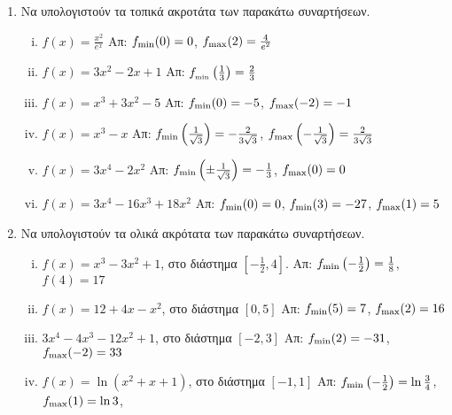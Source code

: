 


\everymath{\displaystyle}



\begin{center}
\end{center}


\vspace{\baselineskip}

\begin{enumerate}
    \item Να υπολογιστούν τα τοπικά ακροτάτα των παρακάτω συναρτήσεων.

        \begin{enumerate}[i)]
            \item $ f(x) = \frac{x^{2}}{e^{x}}  $ \hfill Απ: $ f_{\rm min}(0) = 0 $, $ f_{\rm max}(2) = \frac{4}{e^{2}} $ 

        \item $ f(x) = 3x^{2}-2x+1 $ \hfill Απ: $ f_{\rm_{min}}\left(\frac{1}{3}\right) = \frac{2}{3} $ 
        \item $ f(x) = x^{3}+3x^{2}-5 $ \hfill Απ: $ f_{\rm min}(0) = -5 $, $ f_{\rm max}(-2) = -1 $ 
        \item $ f(x) = x^{3} - x $ \hfill Απ: $ f_{\rm min}\left(\frac{1}{\sqrt{3}}\right) = -
            \frac{2}{3 \sqrt{3}} $, $ f_{\rm max}\left(-\frac{1}{\sqrt{3}}\right) = \frac{2}{3 \sqrt{3}} $

        \item $ f(x) = 3x^{4} - 2x^{2} $ \hfill Απ: $ f_{\rm min}\left(\pm \frac{1}{\sqrt{3}}\right) = - \frac{1}{3} $, $ f_{\rm max}(0) = 0 $

        \item $ f(x) = 3x^{4} -16x^{3}+18x^{2} $ \hfill Απ: $ f_{\rm min}(0)=0 $, $ f_{\rm
            min}(3)=-27 $, $ f_{\rm max}(1) = 5 $ 

        \end{enumerate}

    \item Να υπολογιστούν τα ολικά ακρότατα των παρακάτω συναρτήσεων.
        \begin{enumerate}[i)]
            \item $ f(x) = x^{3} - 3x^{2} + 1 $, στο διάστημα $ \left[- \frac{1}{2}, 4\right] $. \hfill Απ: $ f_{\rm min}\left(- \frac{1}{2}\right) = \frac{1}{8} $, $ f(4) = 17 $
            \item $ f(x) = 12 + 4x - x^{2} $, στο διάστημα $ [0,5] $ \hfill Απ: $ f_{\rm min}(5)=7
                $, $ f_{\rm max}(2)=16 $ 
            \item $ 3x^{4}-4x^{3}-12x^{2} + 1 $, στο διάστημα $ [-2,3] $ \hfill Απ: $ f_{\rm
                min}(2)=-31 $, $ f_{\rm max}(-2)=33 $
            \item $ f(x)= \ln{(x^{2}+x+1)} $, στο διάστημα $ [-1,1] $ \hfill Απ: $ f_{\rm
                min}\left(-\frac{1}{2}\right)= \ln{ \frac{3}{4} }$, $ f_{\rm max}(1)=
                \ln{3} $,  

        \end{enumerate}
\end{enumerate}



